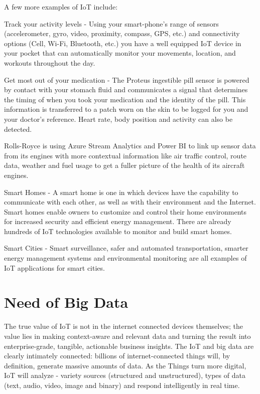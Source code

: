 \documentclass[sigconf]{acmart}
\begin{document}
A few more examples of IoT include:

Track your activity levels - Using your smart-phone's range of sensors (accelerometer, gyro, video, proximity, compass, GPS, etc.) and connectivity options (Cell, Wi-Fi, Bluetooth, etc.) you have a well equipped IoT device in your pocket that can automatically monitor your movements, location, and workouts throughout the day.

Get most out of your medication - The Proteus ingestible pill sensor is powered by contact with your stomach fluid and communicates a signal that determines the timing of when you took your medication and the identity of the pill. This information is transferred to a patch worn on the skin to be logged for you and your doctor's reference. Heart rate, body position and activity can also be detected.

Rolls-Royce is using Azure Stream Analytics and Power BI to link up sensor data from its engines with more contextual information like air traffic control, route data, weather and fuel usage to get a fuller picture of the health of its aircraft engines.

Smart Homes - A smart home is one in which devices have the capability to communicate with each other, as well as with their environment and the Internet. Smart homes enable owners to customize and control their home environments for increased security and efficient energy management. There are already hundreds of IoT technologies available to monitor and build smart homes.

Smart Cities - Smart surveillance, safer and automated transportation, smarter energy management systems and environmental monitoring are all examples of IoT applications for smart cities.

\section{Need of Big Data}

The true value of IoT is not in the internet connected devices themselves; the value lies in making context-aware and relevant data and turning the result into enterprise-grade, tangible, actionable business insights. The IoT and big data are clearly intimately connected: billions of internet-connected things will, by definition, generate massive amounts of data. As the Things turn more digital, IoT will analyze - variety sources (structured and unstructured), types of data (text, audio, video, image and binary) and respond intelligently in real time. 
\end{document}
